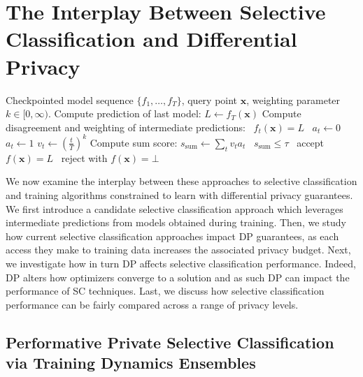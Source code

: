 \section{The Interplay Between Selective Classification and Differential Privacy}

\begin{algorithm}[H]
	\caption{\sctd~\citep{rabanser2022selective}}\label{alg:sctd}
	\begin{algorithmic}[1]
	\Require Checkpointed model sequence $\{f_1,\ldots,f_T\}$, query point $\bm{x}$, weighting parameter $k \in [0,\infty)$.
    \State Compute prediction of last model: $L \gets f_T(\bm{x})$
    \State Compute disagreement and weighting of intermediate predictions: 
        \State \algorithmicif\ $f_t(\bm{x}) = L$ \algorithmicthen\ $a_t \gets 0$ \algorithmicelse\ $a_t \gets 1$
        \State $v_t \gets (\frac{t}{T})^k$
    \EndFor
\State Compute sum score: $s_\text{sum} \gets \sum_{t} v_t a_t$
    \State \algorithmicif\ $s_\text{sum} \leq \tau$ \algorithmicthen\ accept $f(\bm{x}) = L$ \algorithmicelse\ reject with $f(\bm{x}) = \bot$
	\end{algorithmic}
\end{algorithm}

We now examine the interplay between these approaches to selective classification and training algorithms constrained to learn with differential privacy guarantees. We first introduce a candidate selective classification approach which leverages intermediate predictions from models obtained during training. Then, we study how current selective classification approaches impact DP guarantees, as each access they make to training data increases the associated privacy budget. Next, we investigate how in turn DP affects selective classification performance. Indeed, DP alters how optimizers converge to a solution and as such DP can impact the performance of SC techniques. Last, we discuss how selective classification performance can be fairly compared across a range of privacy levels.

\subsection{Performative Private Selective Classification via Training Dynamics Ensembles}

